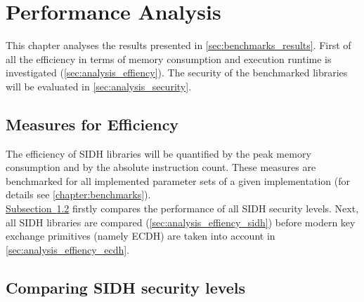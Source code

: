 \chapter{Performance Analysis}\label{chapter:analysis}

This chapter analyses the results presented in \autoref{sec:benchmarks_results}. First of all the efficiency in terms of memory consumption and execution runtime is investigated (\autoref{sec:analysis_effiency}). The security of the benchmarked libraries will be evaluated in \autoref{sec:analysis_security}. 

\section{Measures for Efficiency}\label{sec:analysis_effiency}

The efficiency of SIDH libraries will be quantified by the peak memory consumption and by the absolute instruction count. These measures are benchmarked for all implemented parameter sets of a given implementation (for details see \autoref{chapter:benchmarks}).\\ 
\hyperref[sec:analysis_effiency_sidh]{Subsection~\ref*{sec:analysis_sidh_levels}} firstly compares the performance of all SIDH security levels. Next, all
SIDH libraries are compared (\autoref{sec:analysis_effiency_sidh}) before modern key exchange primitives (namely ECDH) are taken into account in \autoref{sec:analysis_effiency_ecdh}.

\section{Comparing SIDH security levels}\label{sec:analysis_sidh_levels}

